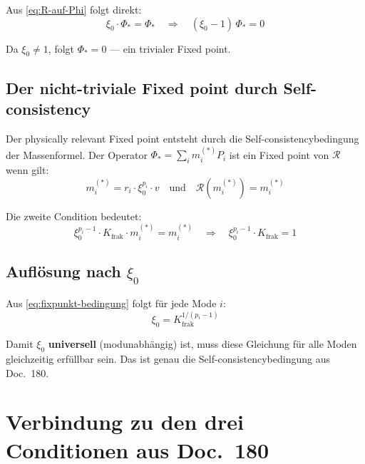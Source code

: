 Aus \eqref{eq:R-auf-Phi} folgt direkt:
\begin{equation}
  \xi_0 \cdot \Phi_* = \Phi_*
  \quad \Rightarrow \quad
  (\xi_0 - 1)\,\Phi_* = 0
\end{equation}

Da $\xi_0 \neq 1$, folgt $\Phi_* = 0$ — ein trivialer Fixed point.

\subsection{Der nicht-triviale Fixed point durch Self-consistency}

Der physically relevant Fixed point entsteht durch die
Self-consistencybedingung der Massenformel. Der Operator
$\Phi_* = \sum_i m_i^{(*)} P_i$ ist ein Fixed point von $\mathcal{R}$
wenn gilt:
\begin{equation}
  m_i^{(*)} = r_i \cdot \xi_0^{p_i} \cdot v
  \quad \text{und} \quad
  \mathcal{R}(m_i^{(*)}) = m_i^{(*)}
  \label{eq:selbstkonsistenz}
\end{equation}

Die zweite Condition bedeutet:
\begin{equation}
  \xi_0^{p_i - 1} \cdot K_{\text{frak}} \cdot m_i^{(*)}
  = m_i^{(*)}
  \quad \Rightarrow \quad
  \xi_0^{p_i - 1} \cdot K_{\text{frak}} = 1
  \label{eq:fixpunkt-bedingung}
\end{equation}

\subsection{Auflösung nach \texorpdfstring{$\xi_0$}{xi0}}

Aus \eqref{eq:fixpunkt-bedingung} folgt für jede Mode $i$:
\begin{equation}
  \xi_0 = K_{\text{frak}}^{1/(p_i-1)}
  \label{eq:xi0-aus-fixpunkt}
\end{equation}

Damit $\xi_0$ \textbf{universell} (modunabhängig) ist, muss diese
Gleichung für alle Moden gleichzeitig erfüllbar sein. Das ist genau
die Self-consistencybedingung aus Doc.~180.

\section{Verbindung zu den drei Conditionen aus Doc.~180}

